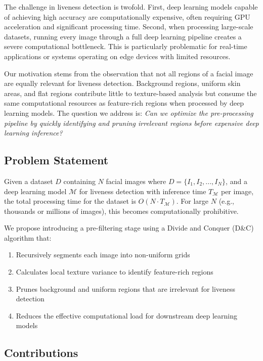 \documentclass[conference]{IEEEtran}
\begin{document}
The challenge in liveness detection is twofold. First, deep learning models capable of achieving high accuracy are computationally expensive, often requiring GPU acceleration and significant processing time. Second, when processing large-scale datasets, running every image through a full deep learning pipeline creates a severe computational bottleneck. This is particularly problematic for real-time applications or systems operating on edge devices with limited resources.

Our motivation stems from the observation that not all regions of a facial image are equally relevant for liveness detection. Background regions, uniform skin areas, and flat regions contribute little to texture-based analysis but consume the same computational resources as feature-rich regions when processed by deep learning models. The question we address is: \textit{Can we optimize the pre-processing pipeline by quickly identifying and pruning irrelevant regions before expensive deep learning inference?}

\subsection{Problem Statement}

Given a dataset $D$ containing $N$ facial images where $D = \{I_1, I_2, ..., I_N\}$, and a deep learning model $\mathcal{M}$ for liveness detection with inference time $T_{\mathcal{M}}$ per image, the total processing time for the dataset is $O(N \cdot T_{\mathcal{M}})$. For large $N$ (e.g., thousands or millions of images), this becomes computationally prohibitive.

We propose introducing a pre-filtering stage using a Divide and Conquer (D\&C) algorithm that:
\begin{enumerate}
    \item Recursively segments each image into non-uniform grids
    \item Calculates local texture variance to identify feature-rich regions
    \item Prunes background and uniform regions that are irrelevant for liveness detection
    \item Reduces the effective computational load for downstream deep learning models
\end{enumerate}

\subsection{Contributions}
\end{document}
